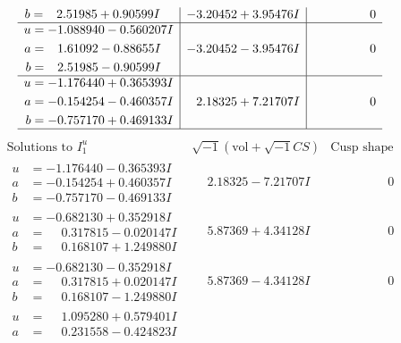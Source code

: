 \documentclass[1p]{elsarticle_modified}
\theoremstyle{definition}
\newcommand{\I}{\sqrt{-1}}
\begin{document}
$$\begin{array}{c|c|c}
\begin{aligned}
b &= \phantom{-}2.51985 + 0.90599 I\end{aligned}
 & -3.20452 + 3.95476 I & \phantom{-0.000000 } 0 \\ \hline\begin{aligned}
u &= -1.088940 - 0.560207 I \\
a &= \phantom{-}1.61092 - 0.88655 I \\
b &= \phantom{-}2.51985 - 0.90599 I\end{aligned}
 & -3.20452 - 3.95476 I & \phantom{-0.000000 } 0 \\ \hline\begin{aligned}
u &= -1.176440 + 0.365393 I \\
a &= -0.154254 - 0.460357 I \\
b &= -0.757170 + 0.469133 I\end{aligned}
 & \phantom{-}2.18325 + 7.21707 I & \phantom{-0.000000 } 0\\
 \hline 
 \end{array}$$\newpage$$\begin{array}{c|c|c}  
\text{Solutions to }I^u_{1}& \I (\text{vol} + \sqrt{-1}CS) & \text{Cusp shape}\\
 \hline 
\begin{aligned}
u &= -1.176440 - 0.365393 I \\
a &= -0.154254 + 0.460357 I \\
b &= -0.757170 - 0.469133 I\end{aligned}
 & \phantom{-}2.18325 - 7.21707 I & \phantom{-0.000000 } 0 \\ \hline\begin{aligned}
u &= -0.682130 + 0.352918 I \\
a &= \phantom{-}0.317815 - 0.020147 I \\
b &= \phantom{-}0.168107 + 1.249880 I\end{aligned}
 & \phantom{-}5.87369 + 4.34128 I & \phantom{-0.000000 } 0 \\ \hline\begin{aligned}
u &= -0.682130 - 0.352918 I \\
a &= \phantom{-}0.317815 + 0.020147 I \\
b &= \phantom{-}0.168107 - 1.249880 I\end{aligned}
 & \phantom{-}5.87369 - 4.34128 I & \phantom{-0.000000 } 0 \\ \hline\begin{aligned}
u &= \phantom{-}1.095280 + 0.579401 I \\
a &= \phantom{-}0.231558 - 0.424823 I \\

\end{aligned}
\end{array}$$
\end{document}
